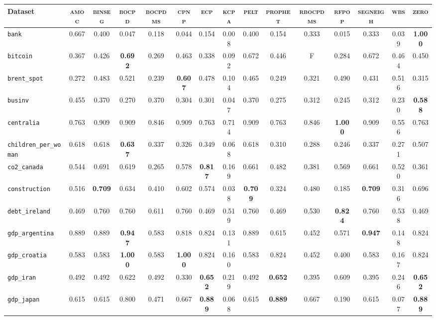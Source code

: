 \begin{tabular}{lcccccccccccccc}
Dataset & \textsc{amoc} & \textsc{binseg} & \textsc{bocpd} & \textsc{bocpdms} & \textsc{cpnp} & \textsc{ecp} & \textsc{kcpa} & \textsc{pelt} & \textsc{prophet} & \textsc{rbocpdms} & \textsc{rfpop} & \textsc{segneigh} & \textsc{wbs} & \textsc{zero}\\
\hline
\verb+bank+ & 0.667 & 0.400 & 0.047 & 0.118 & 0.044 & 0.154 & 0.008 & 0.400 & 0.154 & 0.333 & 0.015 & 0.333 & 0.039 & \textbf{1.000}\\
\verb+bitcoin+ & 0.367 & 0.426 & \textbf{0.692} & 0.269 & 0.463 & 0.338 & 0.092 & 0.672 & 0.446 & F & 0.284 & 0.672 & 0.464 & 0.450\\
\verb+brent_spot+ & 0.272 & 0.483 & 0.521 & 0.239 & \textbf{0.607} & 0.478 & 0.104 & 0.465 & 0.249 & 0.321 & 0.490 & 0.431 & 0.516 & 0.315\\
\verb+businv+ & 0.455 & 0.370 & 0.270 & 0.370 & 0.304 & 0.301 & 0.047 & 0.370 & 0.275 & 0.312 & 0.245 & 0.312 & 0.230 & \textbf{0.588}\\
\verb+centralia+ & 0.763 & 0.909 & 0.909 & 0.846 & 0.909 & 0.763 & 0.714 & 0.909 & 0.763 & 0.846 & \textbf{1.000} & 0.909 & 0.556 & 0.763\\
\verb+children_per_woman+ & 0.618 & 0.618 & \textbf{0.637} & 0.337 & 0.326 & 0.349 & 0.068 & 0.618 & 0.310 & 0.288 & 0.246 & 0.337 & 0.271 & 0.507\\
\verb+co2_canada+ & 0.544 & 0.691 & 0.619 & 0.265 & 0.578 & \textbf{0.817} & 0.169 & 0.661 & 0.482 & 0.381 & 0.569 & 0.661 & 0.520 & 0.361\\
\verb+construction+ & 0.516 & \textbf{0.709} & 0.634 & 0.410 & 0.602 & 0.574 & 0.038 & \textbf{0.709} & 0.324 & 0.480 & 0.185 & \textbf{0.709} & 0.316 & 0.696\\
\verb+debt_ireland+ & 0.469 & 0.760 & 0.760 & 0.611 & 0.760 & 0.469 & 0.519 & 0.760 & 0.469 & 0.530 & \textbf{0.824} & 0.760 & 0.538 & 0.469\\
\verb+gdp_argentina+ & 0.889 & 0.889 & \textbf{0.947} & 0.583 & 0.818 & 0.824 & 0.131 & 0.889 & 0.615 & 0.452 & 0.571 & \textbf{0.947} & 0.148 & 0.824\\
\verb+gdp_croatia+ & 0.583 & 0.583 & \textbf{1.000} & 0.583 & \textbf{1.000} & 0.824 & 0.160 & 0.583 & 0.824 & 0.452 & 0.400 & 0.583 & 0.167 & 0.824\\
\verb+gdp_iran+ & 0.492 & 0.492 & 0.622 & 0.492 & 0.330 & \textbf{0.652} & 0.219 & 0.492 & \textbf{0.652} & 0.395 & 0.609 & 0.395 & 0.246 & \textbf{0.652}\\
\verb+gdp_japan+ & 0.615 & 0.615 & 0.800 & 0.471 & 0.667 & \textbf{0.889} & 0.068 & 0.615 & \textbf{0.889} & 0.667 & 0.190 & 0.615 & 0.077 & \textbf{0.889}\\

\end{tabular}
